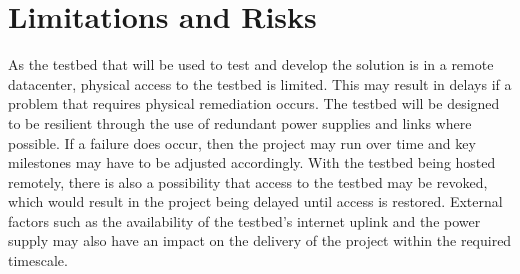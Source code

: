 \section{Limitations and Risks}
\label{intro:constraints}
As the testbed that will be used to test and develop the solution is in a remote datacenter, physical access to the testbed is limited. This may result in delays if a problem that requires physical remediation occurs. The testbed will be designed to be resilient through the use of redundant power supplies and links where possible. If a failure does occur, then the project may run over time and key milestones may have to be adjusted accordingly. With the testbed being hosted remotely, there is also a possibility that access to the testbed may be revoked, which would result in the project being delayed until access is restored. External factors such as the availability of the testbed's internet uplink and the power supply may also have an impact on the delivery of the project within the required timescale.